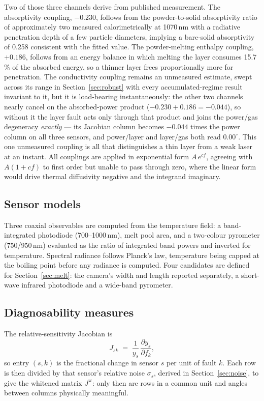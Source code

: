 \documentclass[preprint,times]{elsarticle}
\begin{document}
Two of those three channels derive from published measurement. The absorptivity
coupling, $-0.230$, follows from the powder-to-solid absorptivity ratio of
approximately two measured calorimetrically at 1070\,nm \cite{Trapp2017} with a
radiative penetration depth of a few particle diameters, implying a bare-solid
absorptivity of 0.258 consistent with the fitted value. The powder-melting
enthalpy coupling, $+0.186$, follows from an energy balance in which melting the
layer consumes 15.7\,\% of the absorbed energy, so a thinner layer frees
proportionally more for penetration. The conductivity coupling remains an unmeasured estimate, swept across its range
in Section~\ref{sec:robust} with every accumulated-regime result invariant to it,
but it is load-bearing instantaneously: the other two channels nearly cancel on
the absorbed-power product ($-0.230+0.186=-0.044$), so without it the layer fault
acts only through that product and joins the power/gas degeneracy
\emph{exactly} --- its Jacobian column becomes $-0.044$ times the power column on
all three sensors, and power/layer and layer/gas both read $0.00^\circ$. This one
unmeasured coupling is all that distinguishes a thin layer from a weak laser at
an instant. All couplings are applied in exponential form $A\,e^{cf}$, agreeing with
$A(1+cf)$ to first order but unable to pass through zero, where the linear form
would drive thermal diffusivity negative and the integrand imaginary.

\subsection{Sensor models}

Three coaxial observables are computed from the temperature field: a
band-integrated photodiode (700--1000\,nm), melt pool area, and a two-colour
pyrometer (750/950\,nm) evaluated as the ratio of integrated band powers and
inverted for temperature. Spectral radiance follows Planck's law, temperature
being capped at the boiling point before any radiance is computed. Four
candidates are defined for Section~\ref{sec:melt}: the camera's width and length
reported separately, a short-wave infrared photodiode and a wide-band
pyrometer.

\subsection{Diagnosability measures}

The relative-sensitivity Jacobian is
%
\begin{equation}
J_{sk} \;=\; \frac{1}{y_s}\,\frac{\partial y_s}{\partial f_k},
\label{eq:jac}
\end{equation}
%
so entry $(s,k)$ is the fractional change in sensor $s$ per unit of fault $k$.
Each row is then
divided by that sensor's relative noise $\sigma_s$, derived in
Section~\ref{sec:noise}, to give the whitened matrix $J^{\mathrm{w}}$: only then
are rows in a common unit and angles between columns physically meaningful.
\end{document}
